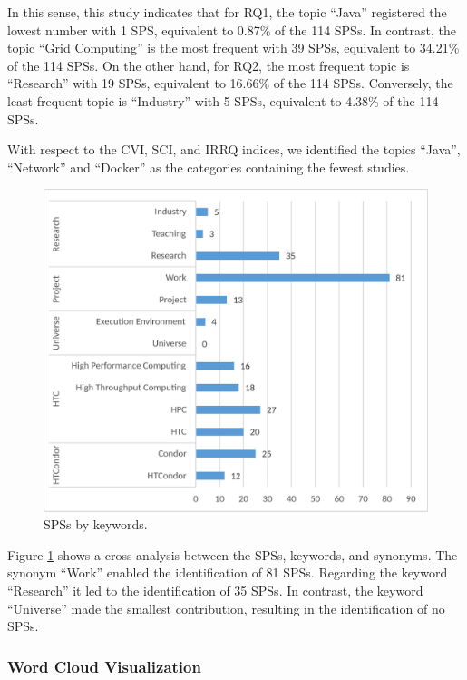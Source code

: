 In this sense, this study indicates that for RQ1, the topic ``Java'' registered the lowest number with 1 SPS, equivalent to 0.87\% of the 114 SPSs. In contrast, the topic ``Grid Computing'' is the most frequent with 39 SPSs, equivalent to 34.21\% of the 114 SPSs. On the other hand, for RQ2, the most frequent topic is ``Research'' with 19 SPSs, equivalent to 16.66\% of the 114 SPSs. Conversely, the least frequent topic is ``Industry'' with 5 SPSs, equivalent to 4.38\% of the 114 SPSs.

With respect to the CVI, SCI, and IRRQ indices, we identified the topics ``Java'', ``Network'' and ``Docker'' as the categories containing the fewest studies.

\begin{figure}[htbp]
	\centering
	\includegraphics[scale=0.3]{resources/figures/Imagen6.eps}
	\caption{SPSs by keywords.}
	\label{fig:SPSsByKeywords}
\end{figure}

Figure \ref{fig:SPSsByKeywords} shows a cross-analysis between the SPSs, keywords, and synonyms. The synonym ``Work'' enabled the identification of 81 SPSs. Regarding the keyword ``Research'' it led to the identification of 35 SPSs. In contrast, the keyword ``Universe'' made the smallest contribution, resulting in the identification of no SPSs.

\subsubsection{Word Cloud Visualization}

